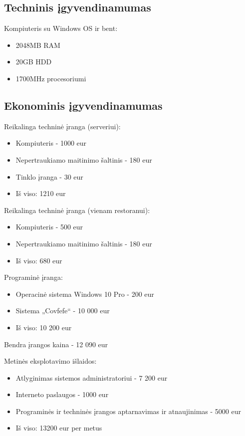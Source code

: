 \documentclass{VUMIFPSkursinis}
\begin{document}
\subsection{Techninis įgyvendinamumas}
Kompiuteris su Windows OS ir bent:\newline
{\begin{itemize}
\item 2048MB RAM
\item 20GB HDD
\item 1700MHz procesoriumi
\end{itemize}

\subsection{Ekonominis įgyvendinamumas}
Reikalinga techninė įranga (serveriui):
{\begin{itemize}
\item Kompiuteris - 1000 eur
\item Nepertraukiamo maitinimo šaltinis - 180 eur
\item Tinklo įranga - 30 eur
\item Iš viso: 1210 eur
\end{itemize}
\hfill\break


Reikalinga techninė įranga (vienam restoranui):

{\begin{itemize}
\item Kompiuteris - 500 eur 
\item Nepertraukiamo maitinimo šaltinis - 180 eur
\item Iš viso: 680 eur
\end{itemize}
\break

Programinė įranga:
{\begin{itemize}
\item Operacinė sistema Windows 10 Pro - 200 eur 
\item Sistema „Covfefe“ - 10 000 eur
\item Iš viso: 10 200 eur
\end{itemize}
\hfill\break

Bendra įrangos kaina - 12 090 eur

Metinės eksplotavimo išlaidos:
{\begin{itemize}
\item Atlyginimas sistemos administratoriui - 7 200 eur
\item Interneto paslaugos - 1000 eur
\item Programinės ir techninės įrangos aptarnavimas ir atnaujinimas - 5000 eur
\item Iš viso: 13200 eur per metus
\end{itemize}
\hfill\break

}}}}}
\end{document}
